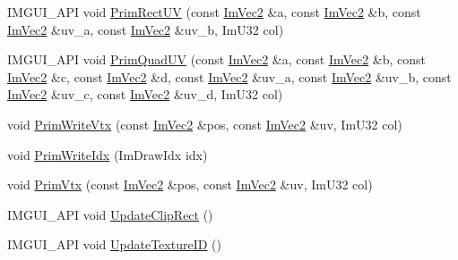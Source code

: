 \begin{DoxyCompactItemize}
\item 
I\+M\+G\+U\+I\+\_\+\+A\+PI void \hyperlink{struct_im_draw_list_a77d48ed5b33ccdd908824c0a3bebfff8}{Prim\+Rect\+UV} (const \hyperlink{struct_im_vec2}{Im\+Vec2} \&a, const \hyperlink{struct_im_vec2}{Im\+Vec2} \&b, const \hyperlink{struct_im_vec2}{Im\+Vec2} \&uv\+\_\+a, const \hyperlink{struct_im_vec2}{Im\+Vec2} \&uv\+\_\+b, Im\+U32 col)
\item 
I\+M\+G\+U\+I\+\_\+\+A\+PI void \hyperlink{struct_im_draw_list_a9df27414aaca5f34ac3664a8b82582b5}{Prim\+Quad\+UV} (const \hyperlink{struct_im_vec2}{Im\+Vec2} \&a, const \hyperlink{struct_im_vec2}{Im\+Vec2} \&b, const \hyperlink{struct_im_vec2}{Im\+Vec2} \&c, const \hyperlink{struct_im_vec2}{Im\+Vec2} \&d, const \hyperlink{struct_im_vec2}{Im\+Vec2} \&uv\+\_\+a, const \hyperlink{struct_im_vec2}{Im\+Vec2} \&uv\+\_\+b, const \hyperlink{struct_im_vec2}{Im\+Vec2} \&uv\+\_\+c, const \hyperlink{struct_im_vec2}{Im\+Vec2} \&uv\+\_\+d, Im\+U32 col)
\item 
void \hyperlink{struct_im_draw_list_af86de4faf6c8e978fb712ea14c5d0c5f}{Prim\+Write\+Vtx} (const \hyperlink{struct_im_vec2}{Im\+Vec2} \&pos, const \hyperlink{struct_im_vec2}{Im\+Vec2} \&uv, Im\+U32 col)
\item 
void \hyperlink{struct_im_draw_list_a42b72f87a0084c02f11dcd1560c8bbc7}{Prim\+Write\+Idx} (Im\+Draw\+Idx idx)
\item 
void \hyperlink{struct_im_draw_list_a405377158f0028ad8b4fb6509eef4532}{Prim\+Vtx} (const \hyperlink{struct_im_vec2}{Im\+Vec2} \&pos, const \hyperlink{struct_im_vec2}{Im\+Vec2} \&uv, Im\+U32 col)
\item 
I\+M\+G\+U\+I\+\_\+\+A\+PI void \hyperlink{struct_im_draw_list_a5978db1fc49be781978699e85c6a3251}{Update\+Clip\+Rect} ()
\item 
I\+M\+G\+U\+I\+\_\+\+A\+PI void \hyperlink{struct_im_draw_list_a58998853ed37538ae5a638da032b0005}{Update\+Texture\+ID} ()
\end{DoxyCompactItemize}
